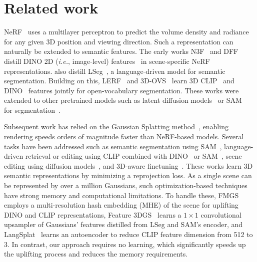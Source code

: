 \section{Related work}
\label{sec:rw}

NeRF~\citep{mildenhall2021nerf} uses a multilayer perceptron to predict the volume density and radiance for any given 3D position and viewing direction.
Such a representation can naturally be extended to semantic features.
The early works N3F~\citep{tschernezki2022n3f} and DFF~\citep{kobayashi2022decomposing} distill DINO 2D (\emph{i.e.}, image-level) features~\citep{caron2021dino} in scene-specific NeRF representations. \citet{kobayashi2022decomposing} also distill LSeg~\citep{li2022lseg}, a  language-driven model for semantic segmentation. Building on this, LERF~\citep{kerr2023lerf} and 3D-OVS~\citep{liu2023weakly} learn 3D CLIP~\citep{radford2021clip} and DINO~\citep{caron2021dino} features jointly for open-vocabulary segmentation. These works were extended to other pretrained models such as latent diffusion models~\citep{ye2023featurenerf} or  SAM~\citep{kirillov2023sam} for segmentation~\citep{cen2023segmentNeRF, ying2023omniseg3d}.

Subsequent work has relied on the Gaussian Splatting method~\citep{kerbl2023gaussiansplatting}, enabling rendering speeds orders of magnitude faster than NeRF-based models. 
Several tasks have been addressed such as semantic segmentation using SAM~\citep{cen2023segmentGS, ye2024gaussiangrouping, kim2024garfield, wu2024opengaussian}, language-driven retrieval or editing using CLIP combined with DINO~\citep{zuo2024fmgs} or SAM~\citep{ye2023featurenerf, wu2024opengaussian}, scene editing using diffusion models~\citep{chen2024gaussianeditor, wang2024gaussianeditor}, and 3D-aware finetuning~\citep{yue2024fit3d}.
These works learn 3D semantic representations by minimizing a reprojection loss.
As a single scene can be represented by over a million Gaussians, such optimization-based techniques have strong memory and computational limitations. 
To handle these, FMGS~\citep{zuo2024fmgs} employs a multi-resolution hash embedding (MHE) of the scene for uplifting DINO and CLIP representations, Feature 3DGS~\citep{zhou2024feature3dgs} learns a $1\times 1$ convolutional upsampler of Gaussians' features distilled from LSeg and SAM's encoder, and LangSplat~\citep{qin2023langsplat} learns an autoencoder to reduce CLIP feature dimension from 512 to 3. In contrast, our approach requires no learning, which significantly speeds up the uplifting process and reduces the memory requirements. 

